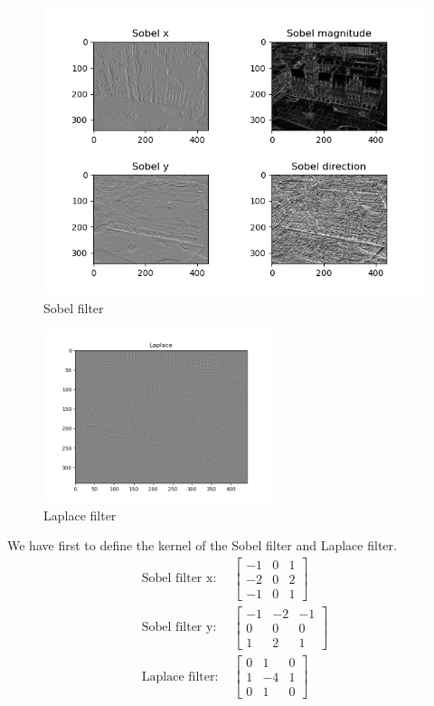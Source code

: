 \documentclass[12pt
,headinclude
,headsepline
,bibtotocnumbered
]{scrartcl}
\begin{document}
\begin{figure}[H]
    \centering
    \includegraphics[width=1\textwidth]{sobel.png}
    \caption{Sobel filter}
    \label{fig:sobel}
\end{figure}
\begin{figure}[H]
    \centering
    \includegraphics[width=0.6\textwidth]{laplace.png}
    \caption{Laplace filter}
    \label{fig:laplace}
\end{figure}
We have first to define the kernel of the Sobel filter and Laplace filter. 
\begin{align*}
    \text{Sobel filter x: } & \begin{bmatrix}
        -1 & 0 & 1 \\
        -2 & 0 & 2 \\
        -1 & 0 & 1
    \end{bmatrix} \\
    \text{Sobel filter y: } & \begin{bmatrix}
        -1 & -2 & -1 \\
        0 & 0 & 0 \\
        1 & 2 & 1
        \end{bmatrix} \\
    \text{Laplace filter: } & \begin{bmatrix}
        0 & 1 & 0 \\
        1 & -4 & 1 \\
        0 & 1 & 0
    \end{bmatrix}
\end{align*}
\end{document}
